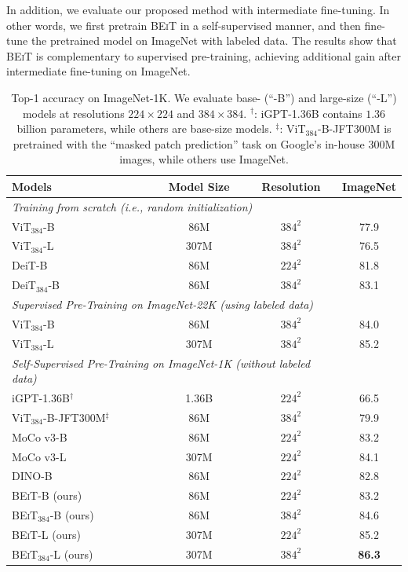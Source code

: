 \documentclass{article}
\newcommand\our{\textsc{BEiT}}
\begin{document}
In addition, we evaluate our proposed method with intermediate fine-tuning.
In other words, we first pretrain \our{} in a self-supervised manner, and then fine-tune the pretrained model on ImageNet with labeled data.
The results show that \our{} is complementary to supervised pre-training, achieving additional gain after intermediate fine-tuning on ImageNet.


\begin{table}[t]
\centering
\begin{tabular}{@{}lccc@{}}
\toprule
\bf Models & \bf Model Size & \bf Resolution & \bf ImageNet \\
\midrule
\multicolumn{3}{l}{\textit{Training from scratch (i.e., random initialization)}} \\
ViT$_{384}$-B~\citep{vit} & 86M & $384^2$ & 77.9 \\
ViT$_{384}$-L~\citep{vit} & 307M & $384^2$ & 76.5 \\
DeiT-B~\citep{deit}           & 86M & $224^2$ &  81.8 \\
DeiT$_{384}$-B~\citep{deit}           & 86M & $384^2$ &  83.1 \\
\midrule
\multicolumn{3}{l}{\textit{Supervised Pre-Training on ImageNet-22K (using labeled data)}} \\
ViT$_{384}$-B~\citep{vit} & 86M &  $384^2$ &  84.0 \\
ViT$_{384}$-L~\citep{vit}  & 307M & $384^2$ & 85.2 \\
\midrule
\multicolumn{3}{l}{\textit{Self-Supervised Pre-Training on ImageNet-1K (without labeled data)}} \\
iGPT-1.36B$^{\dag}$~\citep{igpt} & 1.36B & $224^2$ & 66.5 \\
ViT$_{384}$-B-JFT300M$^{\ddag}$~\citep{vit} & 86M & $384^2$ & 79.9 \\
MoCo v3-B~\citep{mocov3}       & 86M    & $224^2$ &  83.2 \\
MoCo v3-L~\citep{mocov3}                              & 307M  & $224^2$ & 84.1 \\
DINO-B~\citep{dino}       & 86M    & $224^2$ &  82.8 \\
\our{}-B (ours)                                    & 86M & $224^2$ & 83.2 \\
\our{}$_{384}$-B (ours)                                  & 86M  & $384^2$ & 84.6 \\
\our{}-L (ours)                              & 307M  & $224^2$ & 85.2 \\
\our{}$_{384}$-L (ours)                         & 307M  & $384^2$ & \bf 86.3 \\
\bottomrule
\end{tabular}
\caption{Top-1 accuracy on ImageNet-1K.
We evaluate base- (``-B'') and large-size (``-L'') models at resolutions $224\times224$ and $384\times384$.
$^{\dag}$: iGPT-1.36B contains $1.36$ billion parameters, while others are base-size models.
$^{\ddag}$: ViT$_{384}$-B-JFT300M is pretrained with the ``masked patch prediction'' task on Google's in-house $300$M images, while others use ImageNet.}
\label{tbl:results:cls:imagenet}
\end{table}
\end{document}
